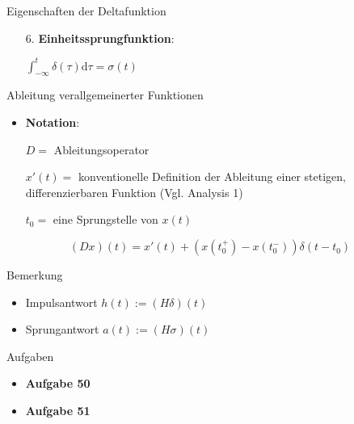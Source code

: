 \documentclass[14pt, aspectratio=169, handout]{beamer}
\begin{document}
\begin{frame}{Eigenschaften der Deltafunktion}
    \begin{itemize}
        \item[6.] \textbf{Einheitssprungfunktion}:
        \item[] $\displaystyle\int_{-\infty}^t \delta(\tau) \text{d}\tau = \sigma(t)$
    \end{itemize}
\end{frame}

\begin{frame}{Ableitung verallgemeinerter Funktionen}
    \begin{itemize}
        \item \textbf{Notation}:
        \item[] $D =$ Ableitungsoperator
        \item[] $x'(t) =$ konventionelle Definition der Ableitung einer stetigen, differenzierbaren Funktion (Vgl. Analysis 1)
        \item[]  $t_0 =$ eine Sprungstelle von $x(t)$
        \item[] 
    \end{itemize}
    $$(Dx)(t) = x'(t) + (x(t_0^+)- x(t_0^-))\delta(t-t_0)$$
\end{frame}

\begin{frame}{Bemerkung}
    \begin{itemize}
        \item Impulsantwort $h(t) := (H \delta)(t)$
        \item Sprungantwort $a(t) := (H \sigma)(t)$
        \item[] 
    \end{itemize}
%
\end{frame}

\begin{frame}{Aufgaben}
    \begin{itemize}
        \item \textbf{Aufgabe 50}
        \item[] 
        \item \textbf{Aufgabe 51}
    \end{itemize}
\end{frame}
\end{document}
